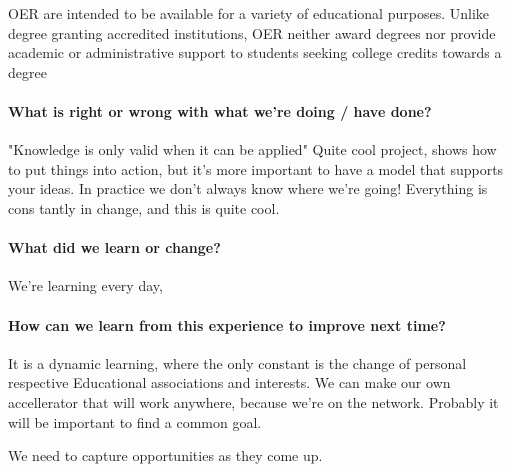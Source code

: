 \documentclass{acm_proc_article-sp}
\begin{document}
OER are intended to be available for a variety of educational purposes. Unlike degree granting accredited institutions, OER neither award degrees nor provide academic or administrative support to students seeking college credits towards a degree


\paragraph{What is right or wrong with what we're doing / have done?}
"Knowledge is only valid when it can be applied"
Quite cool project, shows how to put things into action, but it's more important to have a model that supports your ideas.
In practice we don't always know where we're going!  Everything is cons tantly in change, and this is quite cool.

\paragraph{What did we learn or change?}

We're learning every day,

\paragraph{How can we learn from this experience to improve next time?}

It is a dynamic learning, where the only constant is the change of personal respective Educational associations and interests.
We can make our own accellerator that will work anywhere, because we're on the network.  Probably it will be important to find a common goal.

We need to capture opportunities as they come up.

%

% 
\end{document}
